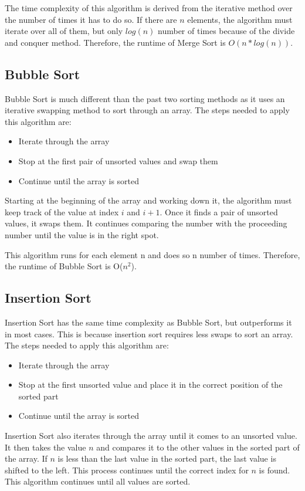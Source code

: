 \documentclass[proceedings]{IEEEtran}
\begin{document}
The time complexity of this algorithm is derived from the iterative method over the number of times it has to do so. If there are $n$ elements, the algorithm must iterate over all of them, but only $log(n)$ number of times because of the divide and conquer method. Therefore, the runtime of Merge Sort is $O(n*log(n))$.
\subsection{Bubble Sort}
Bubble Sort is much different than the past two sorting methods as it uses an iterative swapping method to sort through an array.  The steps needed to apply this algorithm are:
\begin{itemize}
\item Iterate through the array
\item Stop at the first pair of unsorted values and swap them
\item Continue until the array is sorted
\end{itemize}
Starting at the beginning of the array and working down it, the algorithm must keep track of the value at index $i$ and $i+1$. Once it finds a pair of unsorted values, it swaps them. It continues comparing the number with the proceeding number until the value is in the right spot. 

This algorithm runs for each element n and does so n number of times. Therefore, the runtime of Bubble Sort is O($n^2$).
\subsection{Insertion Sort}
Insertion Sort has the same time complexity as Bubble Sort, but outperforms it in most cases. This is because insertion sort requires less swaps to sort an array. The steps needed to apply this algorithm are:
\begin{itemize}
\item Iterate through the array
\item Stop at the first unsorted value and place it in the correct position of the sorted part
\item Continue until the array is sorted
\end{itemize}
Insertion Sort also iterates through the array until it comes to an unsorted value. It then takes the value $n$ and compares it to the other values in the sorted part of the array. If $n$ is less than the last value in the sorted part, the last value is shifted to the left. This process continues until the correct index for $n$ is found. This algorithm continues until all values are sorted. 
\end{document}
